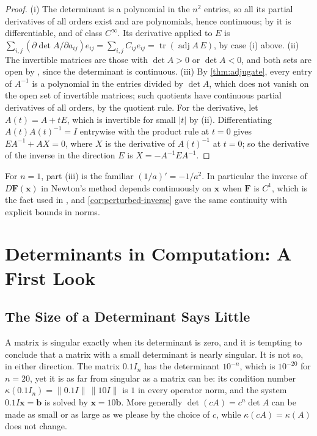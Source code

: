 \begin{proof}
(i) The determinant is a polynomial in the $n^2$ entries, so all its partial derivatives of all orders exist and are polynomials, hence continuous; by  it is differentiable, and of class $C^\infty$. Its derivative applied to $E$ is $\sum_{i,j}(\partial\det A/\partial a_{ij})e_{ij}=\sum_{i,j}C_{ij}e_{ij}=\operatorname{tr}(\operatorname{adj}A\,E)$, by case (i) above. (ii) The invertible matrices are those with $\det A>0$ or $\det A<0$, and both sets are open by , since the determinant is continuous. (iii) By \cref{thm:adjugate}, every entry of $A^{-1}$ is a polynomial in the entries divided by $\det A$, which does not vanish on the open set of invertible matrices; such quotients have continuous partial derivatives of all orders, by the quotient rule. For the derivative, let $A(t)=A+tE$, which is invertible for small $|t|$ by (ii). Differentiating $A(t)A(t)^{-1}=I$ entrywise with the product rule at $t=0$ gives $EA^{-1}+AX=0$, where $X$ is the derivative of $A(t)^{-1}$ at $t=0$; so the derivative of the inverse in the direction $E$ is $X=-A^{-1}EA^{-1}$.
\end{proof}

For $n=1$, part (iii) is the familiar $(1/a)'=-1/a^2$. In particular the inverse of $D\mathbf F(\mathbf x)$ in Newton's method depends continuously on $\mathbf x$ when $\mathbf F$ is $C^1$, which is the fact used in , and \cref{cor:perturbed-inverse} gave the same continuity with explicit bounds in norms.

\section{Determinants in Computation: A First Look}
\label{sec:det-computation}

\subsection{The Size of a Determinant Says Little}

A matrix is singular exactly when its determinant is zero, and it is tempting to conclude that a matrix with a small determinant is nearly singular. It is not so, in either direction. The matrix $0.1I_n$ has the determinant $10^{-n}$, which is $10^{-20}$ for $n=20$, yet it is as far from singular as a matrix can be: its condition number $\kappa(0.1I_n)=\|0.1I\|\,\|10I\|$ is $1$ in every operator norm, and the system $0.1I\mathbf x=\mathbf b$ is solved by $\mathbf x=10\mathbf b$. More generally $\det(cA)=c^n\det A$ can be made as small or as large as we please by the choice of $c$, while $\kappa(cA)=\kappa(A)$ does not change.

